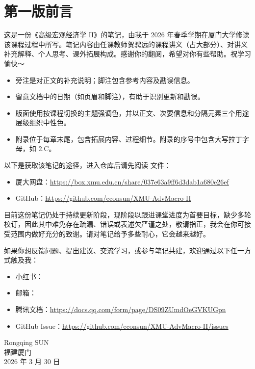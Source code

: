 \cleardoublepage
\pagestyle{symplain}
\thispagestyle{symplain}

\chapter*{第一版前言}
\vspace{\baselineskip}


这是一份《高级宏观经济学 II》的笔记，由我于 2026 年春季学期在厦门大学修读该课程过程中所写。笔记内容由任课教师贺骋远的课程讲义（占大部分）、对讲义补充解释、个人思考、课外拓展构成。感谢你的翻阅，希望对你有些帮助。祝学习愉快～


\begin{itemize}
    \item 旁注是对正文的补充说明；脚注包含参考内容及勘误信息。
    \item 留意文档中的日期（如页眉和脚注），有助于识别更新和勘误。
    \item 版面使用按课程切换的主题强调色，并以正文、次要信息和分隔元素三个用途层级组织中性色。
    \item 附录位于每章末尾，包含拓展内容、过程细节。附录的序号中包含大写拉丁字母，如 2.C。
\end{itemize}

\myskip
{}

以下是获取该笔记的途径，进入仓库后请先阅读  文件：
\begin{itemize}
    \item 厦大网盘：\url{https://box.xmu.edu.cn/share/037e63a9ff6d3dab1a680e26ef}
    \item GitHub：\url{https://github.com/econsun/XMU-AdvMacro-II}
\end{itemize}

\myskip
{}

目前这份笔记仍处于持续更新阶段，现阶段以跟进课堂进度为首要目标，缺少多轮校订，因此其中难免存在疏漏、错误或表述欠严谨之处，敬请指正，我会在你可接受范围内做好充分的致谢。请对笔记给予多些耐心，它会越来越好。

如果你想反馈问题、提出建议、交流学习，或参与笔记共建，欢迎通过以下任一方式触及我：
\begin{itemize}
    \item 小红书：
    \item 邮箱：
    \item 腾讯文档：\url{https://docs.qq.com/form/page/DS09ZUmdOeGVKUGpn}
    \item GitHub Issue：\url{https://github.com/econsun/XMU-AdvMacro-II/issues}
\end{itemize}

\vspace{\baselineskip}
\begin{flushright}
Rongqing SUN\\
福建\hspace{0.35em}\textperiodcentered\hspace{0.35em}厦门\\
2026 年 3 月 30 日
\end{flushright}

\clearpage
\pagestyle{symplain}



